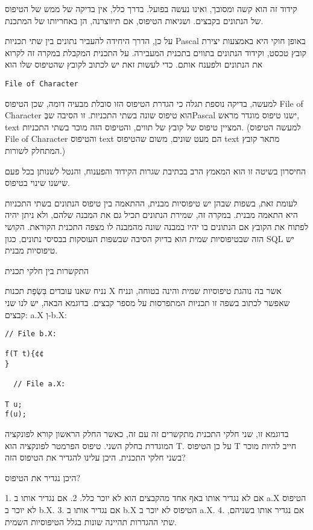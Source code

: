\begin{טבלא}[!htbp]
      קידוד זה הוא קשה ומסובך, ואינו נעשה בפועל. בדרך כלל, אין בדיקה של ממש של הטיפוס
      של הנתונים בקבצים. ושגיאות הטיפוס, אם תיווצרנה, הן באחריותו של המתכנת.

      על כן, הדרך היחידה להעביר נתונים בין שתי תכניות Pascal באופן חוקי היא באמצעות
      יצירת קובץ טכסט, וקידוד הנתונים בתווים בתכנית המעבירה. על התכנית המקבלת במקרה
      זה לקרוא את הנתונים ולפענח אותם. כדי לעשות זאת יש לכתוב לקובץ שהטיפוס שלו הוא

\begin{verbatim}
File of Character
\end{verbatim}
      למעשה, בדיקה נוספת תגלה כי הגדרת הטיפוס הזו סובלת מבעיה דומה, שכן הטיפוס File
      of Character הוא טיפוס שונה בשתי התכניות. זו הסיבה שבְּPascal ישנו טיפוס מוגדר
      מראש, text המציין טיפוס של קובץ של תווים, והטיפוס הזה מוכר בשתי התכניות. (למעשה
      הטיפוס File of Character והטיפוס text הם מעט שונים, משום שהטיפוס text מתאר קובץ
      המתחלק לשורות.)

      החיסרון בשיטה זו הוא המאמץ הרב בכתיבת שגרות הקידוד והפענוח, והנטל לשנותן בכל
      פעם שישנו שינוי בטיפוס.

      לעומת זאת, בשפות שבהן יש טיפוסיות מבנית, ההתאמה בין טיפוס הנתונים בשתי התכניות
      היא התאמה מבנית. במקרה זה, שמירת הנתונים תכיל גם את המבנה שלהם, ולא ניתן יהיה
      לפתוח את הקובץ אם הנתונים בו יהיו במבנה שונה מהמבנה לו מצפה התכנית הקוראת.
      הקושי הזה שבטיפוסיות שמית הוא בדיוק הסיבה שבשפות העוסקות בבסיסי נתונים, כגון
      SQL יש טיפוסיות מבנית.

      התקשרות בין חלקי תכנית

      נניח שאנו עובדים בִּשְׂפַת תכנות X אשר בה נוהגת טיפוסיות שמית והינה בטוחה, ונניח שאפשר לכתוב בשפה זו תכניות המתפרסות על מספר קבצים. בדוגמא הבאה, יש לנו שני קבצים: a.X וְ-b.X:

\begin{verbatim}
// File b.X:

f(T t){¢¢
}

  // File a.X:

T u;
f(u);
\end{verbatim}

      בדוגמא זו, שני חלקי התכנית מתקשרים זה עם זה, כאשר החלק הראשון קורא לפונקציה
      המוגדרת בחלק השני. טיפוס הפרמטר לפונקציה הוא T. על כן הטיפוס T חייב להיות מוכר
      בשני חלקי התכנית. היכן עלינו להגדיר את הטיפוס הזה?

      היכן נגדיר את הטיפוס?

      1. אם לא נגדיר אותו באף אחד מהקבצים הוא לא יוכר כלל.
      2. אם נגדיר אותו ב a.X הטיפוס לא יוכר ב b.X.
      3. אם נגדיר אותו ב b.X הטיפוס לא יוכר ב a.X.
      4. אם נגדיר אותו בשניהם, שתי ההגדרות תהיינה שונות בגלל הטיפוסיות השמית.


\end{טבלא}

